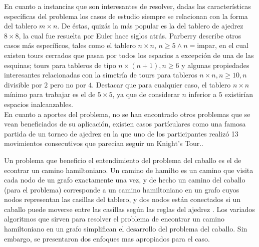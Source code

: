 \documentclass[journal, 10pt]{IEEEtran}
\begin{document}
En cuanto a instancias que son interesantes de resolver, dadas las características específicas del problema los casos de estudio siempre se relacionan con la forma del tablero $m \times n$. De éstas, quizás la más popular es la del tablero de ajedrez $8 \times 8$, la cual fue resuelta por Euler \cite{Euler:1759} hace siglos atrás. Parberry \cite{Parberry:1997} describe otros casos más específicos, tales como el tablero $n \times n$, $n \ge 5 \wedge n=\text{impar}$, en el cual existen tours cerrados que pasan por todos los espacios a excepción de una de las esquinas; tours para tableros de tipo $n \times (n+1), n \ge 6$ y algunas propiedades interesantes relacionadas con la simetría de tours para tableros $n \times n, n \ge 10, n$ divisible por $2$ pero no por $4$. Destacar que para cualquier caso, el tablero $n \times n$ mínimo para trabajar es el de $5\times 5$, ya que de considerar $n$ inferior a $5$ existirían espacios inalcanzables.\\
En cuanto a aportes del problema, no se han encontrado otros problemas que se vean beneficiados de su aplicación, existen casos partículares como una famosa partida de un torneo de ajedrez en la que uno de los participantes realizó 13 movimientos consecutivos que parecían seguir un Knight's Tour.\cite{Shabazz:2010}.


Un problema que beneficio el entendimiento del problema del caballo es el de econtrar un camino hamiltoniano. Un camino de hamilto es un camino que visita cada nodo de un grafo exactamente una vez, y de hecho un camino del caballo (para el problema) corresponde a un camino hamiltoniano en un grafo cuyos nodos representan las casillas  del tablero, y dos nodos est\'an conectados si un caballo puede moverse entre las casillas seg\'un las reglas del ajedrez \cite{Rosen/2002}. Los variados algoritmos que sirven para resolver el problema de encontrar un camino hamiltoniano en un grafo simplifican el desarrollo del problema del caballo. Sin embargo, se presentaron dos enfoques mas apropiados para el caso.
 


\end{document}
